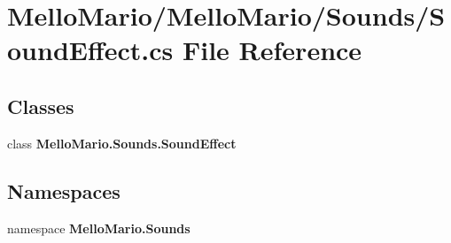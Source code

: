 \section{Mello\+Mario/\+Mello\+Mario/\+Sounds/\+Sound\+Effect.cs File Reference}
\label{SoundEffect_8cs}
\subsection*{Classes}
\begin{DoxyCompactItemize}
\item 
class \textbf{ Mello\+Mario.\+Sounds.\+Sound\+Effect}
\end{DoxyCompactItemize}
\subsection*{Namespaces}
\begin{DoxyCompactItemize}
\item 
namespace \textbf{ Mello\+Mario.\+Sounds}
\end{DoxyCompactItemize}
